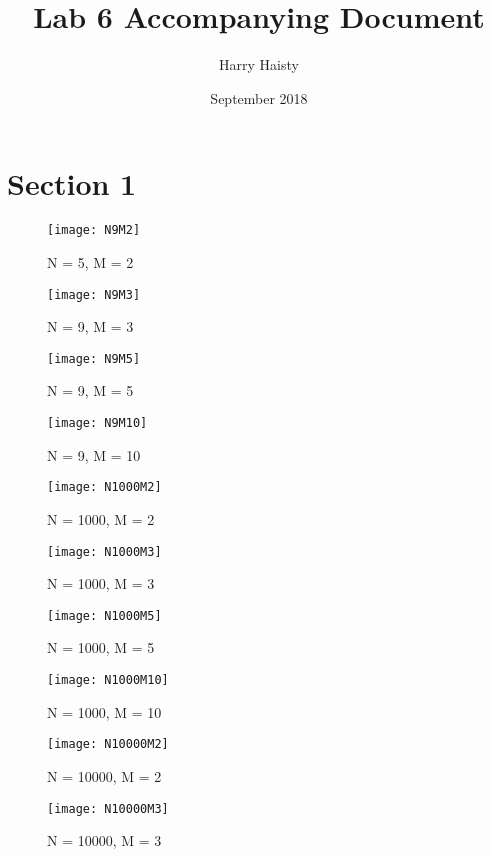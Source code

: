 \documentclass[11pt]{article}
\title{Lab 6 Accompanying Document}
\author{Harry Haisty}
\date{September 2018}
\begin{document}
\maketitle

\section*{Section 1}
\begin{figure}[h]
    \centering
    \texttt{[image: N9M2]}
    \caption{N = 5, M = 2}
\end{figure}

\begin{figure}[h]
    \centering
    \texttt{[image: N9M3]}
    \caption{N = 9, M = 3}
\end{figure}

\begin{figure}[h]
    \centering
    \texttt{[image: N9M5]}
    \caption{N = 9, M = 5}
\end{figure}

\begin{figure}[h]
    \centering
    \texttt{[image: N9M10]}
    \caption{N = 9, M = 10}
\end{figure}

\begin{figure}[h]
    \centering
    \texttt{[image: N1000M2]}
    \caption{N = 1000, M = 2}
\end{figure}

\begin{figure}[h]
    \centering
    \texttt{[image: N1000M3]}
    \caption{N = 1000, M = 3}
\end{figure}

\begin{figure}[h]
    \centering
    \texttt{[image: N1000M5]}
    \caption{N = 1000, M = 5}
\end{figure}

\begin{figure}[h]
    \centering
    \texttt{[image: N1000M10]}
    \caption{N = 1000, M = 10}
\end{figure}

\begin{figure}[h]
    \centering
    \texttt{[image: N10000M2]}
    \caption{N = 10000, M = 2}
\end{figure}

\begin{figure}[h]
    \centering
    \texttt{[image: N10000M3]}
    \caption{N = 10000, M = 3}
\end{figure}
\end{document}
